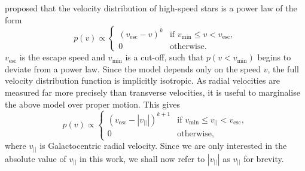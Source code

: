 \documentclass[useAMS,twocolumn,usenatbib]{mn2e}
\def\vlos{{v_{||}}}
\def\vesc{{v_\mathrm{esc}}}
\def\vmin{{v_\mathrm{min}}}
\begin{document}
\cite{Le90} proposed that the velocity distribution of high-speed
stars is a power law of the form
%
\begin{equation}
  p(v)\propto\begin{cases}
    (\vesc - v)^k & \text{if $\vmin \leq v<\vesc$},\\
    0 & \text{otherwise}.
  \end{cases}
  \label{eq:lt90}
\end{equation}
%
$\vesc$ is the escape speed and $\vmin$ is a cut-off, 
such that $p(v < \vmin)$ begins to deviate from a power 
law. Since the model depends only on the speed $v$, 
the full velocity distribution function is implicitly 
isotropic. As radial velocities are measured far more precisely 
than transverse velocities, it is useful to marginalise 
the above model over proper motion. This gives
%
\begin{equation}
  p(v)\propto\begin{cases}
    (\vesc - |\vlos|)^{k+1} & \text{if $\vmin \leq \vlos <\vesc$},\\
    0 & \text{otherwise},
  \end{cases}
\end{equation}
%
where $\vlos$ is Galactocentric radial velocity. Since we are only
interested in the absolute value of $\vlos$ in this work, we shall now
refer to $|\vlos|$ as $\vlos$ for brevity.
\end{document}
